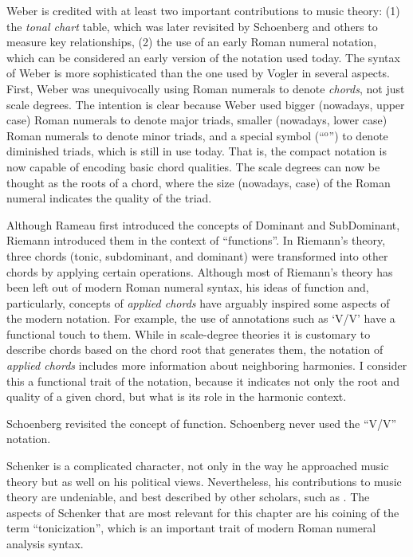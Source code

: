 Weber is credited with at least two important contributions to music theory: (1) the \emph{tonal chart} table, which was later revisited by Schoenberg and others to measure key relationships, (2) the use of an early Roman numeral notation, which can be considered an early version of the notation used today.
The syntax of Weber is more sophisticated than the one used by Vogler in several aspects.
First, Weber was unequivocally using Roman numerals to denote \emph{chords}, not just scale degrees.
The intention is clear because Weber used bigger (nowadays, upper case) Roman numerals to denote major triads, smaller (nowadays, lower case) Roman numerals to denote minor triads, and a special symbol (``$^{\text{o}}$'') to denote diminished triads, which is still in use today.
That is, the compact notation is now capable of encoding basic chord qualities.
The scale degrees can now be thought as the roots of a chord, where the size (nowadays, case) of the Roman numeral indicates the quality of the triad.

Although Rameau first introduced the concepts of Dominant and SubDominant, Riemann introduced them in the context of ``functions''.
In Riemann's theory, three chords (tonic, subdominant, and dominant) were transformed into other chords by applying certain operations.
Although most of Riemann's theory has been left out of modern Roman numeral syntax, his ideas of function and, particularly, concepts of \emph{applied chords} have arguably inspired some aspects of the modern notation.
For example, the use of annotations such as `V/V' have a functional touch to them.
While in scale-degree theories it is customary to describe chords based on the chord root that generates them, the notation of \emph{applied chords} includes more information about neighboring harmonies.
I consider this a functional trait of the notation, because it indicates not only the root and quality of a given chord, but what is its role in the harmonic context.

Schoenberg revisited the concept of function.
Schoenberg never used the ``V/V'' notation.

Schenker is a complicated character, not only in the way he approached music theory but as well on his political views.
Nevertheless, his contributions to music theory are undeniable, and best described by other scholars, such as \cite{christensen_heinrich_2002}.
The aspects of Schenker that are most relevant for this chapter are his coining of the term ``tonicization'', which is an important trait of modern Roman numeral analysis syntax.

